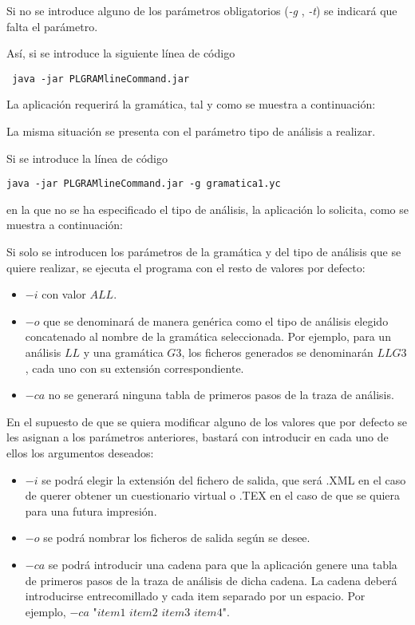  
Si no se introduce alguno de los parámetros obligatorios (\textit{-g} , \textit{-t}) se indicará que falta el parámetro.
 
Así, si se introduce la siguiente línea de código 
\begin{verbatim}
 java -jar PLGRAMlineCommand.jar  
\end{verbatim}

La aplicación requerirá la gramática, tal y como se muestra a continuación:

 
La misma situación se presenta con el parámetro tipo de análisis a realizar.
 
Si se  introduce la línea de código
\begin{verbatim}
java -jar PLGRAMlineCommand.jar -g gramatica1.yc 
\end{verbatim}
en la que no se ha especificado el tipo de análisis, la aplicación lo solicita, como se muestra a continuación:

Si solo se introducen los parámetros de la gramática y del tipo de análisis que se quiere realizar, se ejecuta el programa con el resto de valores por defecto:
\begin{itemize}
\item $-i$ con valor $ALL$.
\item $-o$ que se denominará de manera genérica como el tipo de análisis elegido concatenado al nombre de la gramática seleccionada. Por ejemplo, para un análisis $LL$ y una gramática $G3$, los ficheros generados se denominarán $LLG3$, cada uno con su extensión correspondiente.
\item $-ca$ no se generará ninguna tabla de primeros pasos de la traza de análisis.
\end{itemize}


En el supuesto de que se quiera modificar alguno de los valores que por defecto se les asignan a los parámetros anteriores, bastará con introducir en cada uno de ellos los argumentos deseados:
\begin{itemize}
\item $-i$ se podrá elegir la extensión del fichero de salida, que será .XML en el caso de querer obtener un cuestionario virtual o .TEX en el caso de que se quiera para una futura impresión.
\item $-o$ se podrá nombrar los ficheros de salida según se desee.
\item $-ca$ se podrá introducir una cadena para  que la aplicación genere una tabla de primeros pasos de la traza de análisis de dicha cadena.
La cadena deberá introducirse entrecomillado y cada item separado por un espacio. Por ejemplo, $-ca$ "$item1$ $item2$ $item3$ $item4$".
\end{itemize}


